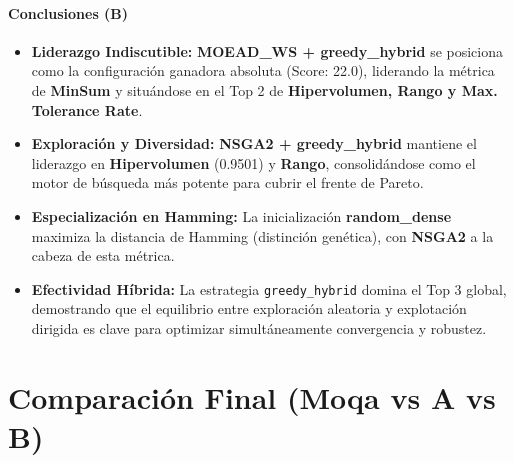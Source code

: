\documentclass[a4paper,10pt]{article} %
\begin{document}
\paragraph{Conclusiones (B)}
\begin{itemize}
    \item \textbf{Liderazgo Indiscutible:} \textbf{MOEAD\_WS + greedy\_hybrid} se posiciona como la configuración ganadora absoluta (Score: 22.0), liderando la métrica de \textbf{MinSum} y situándose en el Top 2 de \textbf{Hipervolumen, Rango y Max. Tolerance Rate}.
    \item \textbf{Exploración y Diversidad:} \textbf{NSGA2 + greedy\_hybrid} mantiene el liderazgo en \textbf{Hipervolumen} (0.9501) y \textbf{Rango}, consolidándose como el motor de búsqueda más potente para cubrir el frente de Pareto.
    \item \textbf{Especialización en Hamming:} La inicialización \textbf{random\_dense} maximiza la distancia de Hamming (distinción genética), con \textbf{NSGA2} a la cabeza de esta métrica.
    \item \textbf{Efectividad Híbrida:} La estrategia \texttt{greedy\_hybrid} domina el Top 3 global, demostrando que el equilibrio entre exploración aleatoria y explotación dirigida es clave para optimizar simultáneamente convergencia y robustez.
\end{itemize}


\section{Comparación Final (Moqa vs A vs B)}
\end{document}
